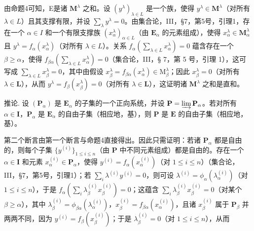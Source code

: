 由命题4可知，E是诸 \(\mathbf{M}^{\lambda}\) 之和。设 \((y^{\lambda})_{\lambda \in L}\) 是一个族，使得 \(y^{\lambda} \in \mathbf{M}^{\lambda}\)（对所有 \(\lambda \in L\)）且其支撑有限，并设 \(\sum_{\lambda} y^{\lambda} = 0\)。由集合论，III，§7，第5号，引理1，存在一个 \(\alpha \in I\) 和一个有限支撑族 \((x_{\alpha}^{\lambda})_{\alpha \in L}\)（由 \(\mathbf{E}_{\alpha}\) 的元素组成），使得 \(x_{\alpha}^{\lambda} \in \mathbf{M}_{\alpha}^{\lambda}\) 且 \(y^{\lambda} = f_{\alpha}(x_{\alpha}^{\lambda})\)（对所有 \(\lambda \in L\)）。关系 \(f_{\alpha}\left(\sum_{\lambda \in L} x_{\alpha}^{\lambda}\right) = 0\) 蕴含存在一个 \(\beta \geqslant \alpha\)，使得 \(f_{\beta \alpha}\left(\sum_{\lambda \in L} x_{\alpha}^{\lambda}\right) = 0\)（集合论，III，§ 7，第 5 号，引理 1），这可写成 \(\sum_{\lambda \in L} x_{\beta}^{\lambda} = 0\)，其中由假设 \(x_{\beta}^{\lambda} = f_{\beta \alpha}(x_{\alpha}^{\lambda}) \in \mathrm{M}_{\beta}^{\lambda}\)；因此 \(x_{\beta}^{\lambda} = 0\)（对所有 \(\lambda \in \mathbf{L}\)），从而 \(y^{\lambda} = f_{\beta}(x_{\beta}^{\lambda}) = 0\)（对所有 \(\lambda \in \mathbf{L}\)），这证明诸 \(\mathbf{M}^{\lambda}\) 之和是直和。

推论. 设 \((\mathbf{P}_{\alpha})\) 是 \(\mathbf{E}_{\alpha}\) 的子集的一个正向系统，并设 \(\mathbf{P} = \varinjlim \mathbf{P}_{\alpha}\)。若对所有 \(\alpha \in \mathbf{I}\)，\(\mathbf{P}_{\alpha}\) 是 \(\mathbf{E}_{\alpha}\) 的自由子集（相应地，基），则 \(\mathbf{P}\) 是 \(\mathbf{E}\) 的自由子集（相应地，基）。

第二个断言由第一个断言与命题4直接得出。因此只需证明：若诸 \(\mathbf{P}_{\alpha}\) 都是自由的，则每个子集 \(\{y^{(i)}\}_{1\leqslant i\leqslant n}\)（由 \(\mathbf{P}\) 中不同元素组成）都是自由的。存在一个 \(\alpha \in \mathbf{I}\) 和元素 \(x_{\alpha}^{(i)}\in \mathbf{P}_{\alpha}\)，使得 \(y^{(i)} = f_{\alpha}(x_{\alpha}^{(i)})\)（对 \(1\leqslant i\leqslant n\)）（集合论，III，§7，第5号，引理1）；若 \(\sum_{i}\lambda^{(i)}y^{(i)} = 0\)，则可设 \(\lambda^{(i)} = \phi_{\alpha}(\lambda_{\alpha}^{(i)})\)（对 \(1\leqslant i\leqslant n\)），于是 \(f_{\alpha}\left(\sum_{i}\lambda_{\beta}^{(i)}x_{\beta}^{(i)}\right) = 0\)；这蕴含 \(\sum_{i}\lambda_{\beta}^{(i)}x_{\beta}^{(i)} = 0\)（对某个 \(\beta \geqslant \alpha\)），其中 \(\lambda_{\beta}^{(i)} = \phi_{\beta \alpha}(\lambda_{\alpha}^{(i)})\)，\(x_{\beta}^{(i)} = f_{\beta \alpha}(x_{\alpha}^{(i)})\)，且诸 \(x_{\beta}^{(i)}\) 属于 \(\mathbf{P}_{\beta}\) 并两两不同，因为 \(y^{(i)} = f_{\beta}(x_{\beta}^{(i)})\)；于是 \(\lambda_{\beta}^{(i)} = 0\)（对 \(1\leqslant i\leqslant n\)），从而

